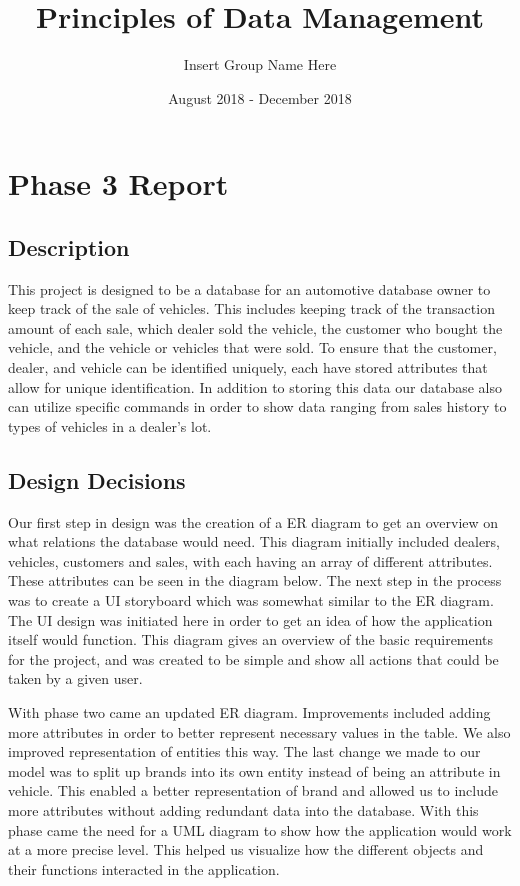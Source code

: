 \documentclass{math}
\title{Principles of Data Management}
\author{Insert Group Name Here}
\date{August 2018 - December 2018}
\begin{document}
\lstset{basicstyle=\ttfamily\footnotesize,breaklines=true}
\maketitle

\section*{Phase 3 Report}

\subsection*{Description}
This project is designed to be a database for an automotive database owner to
keep track of the sale of vehicles. This includes keeping track of the
transaction amount of each sale, which dealer sold the vehicle, the customer
who bought the vehicle, and the vehicle or vehicles that were sold. To ensure
that the customer, dealer, and vehicle can be identified uniquely, each have
stored attributes that allow for unique identification. In addition
to storing this data our database also can utilize specific commands in order to
show data ranging from sales history to types of vehicles in a dealer’s lot.

\subsection*{Design Decisions}
Our first step in design was the creation of a ER diagram to get an overview on
what relations the database would need. This diagram initially included
dealers, vehicles, customers and sales, with each having an array of different
attributes. These attributes can be seen in the diagram below. The next step in
the process was to create a UI storyboard which was somewhat similar to the ER
diagram. The UI design was initiated here in order to get an idea of how the
application itself would function. This diagram gives an overview of the basic
requirements for the project, and was created to be simple and show all actions
that could be taken by a given user. \par
With phase two came an updated ER diagram. Improvements included adding more
attributes in order to better represent necessary values in the table. We also
improved representation of entities this way. The last change we made to our
model was to split up brands into its own entity instead of being an attribute
in vehicle. This enabled a better representation of brand and allowed us to
include more attributes without adding redundant data into the database. With
this phase came the need for a UML diagram to show how the application would
work at a more precise level. This helped us visualize how the different
objects and their functions interacted in the application.
\end{document}
